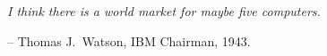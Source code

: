 \documentclass[\main/thesis.tex]{subfiles}
\begin{document}
\begin{quotepage}
 \vspace*{1in}
 \begin{center}
	\emph{I think there is a world market for maybe five computers.}
	\begin{flushright}
		-- Thomas J.\ Watson, IBM Chairman, 1943.
	\end{flushright}
 \end{center}
\end{quotepage}
\end{document}
